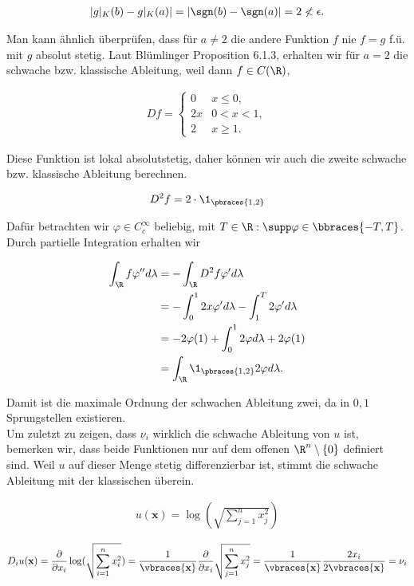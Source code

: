 \begin{solution}
\begin{align*}
  |g|_K(b) - g|_K(a)| = |\sgn(b) - \sgn(a)| = 2 \nless \epsilon.
\end{align*}

Man kann ähnlich überprüfen, dass für $a \neq 2$ die andere Funktion $f$ nie $f = g$ f.ü. mit $g$ absolut stetig. Laut Blümlinger Proposition 6.1.3, erhalten wir für $a = 2$ die schwache bzw. klassische Ableitung, weil dann $f \in C(\R)$,

\begin{align*}
  Df =
  \begin{cases}
    0  & x \leq 0,  \\
    2x & 0 < x < 1, \\
    2  & x \geq 1.
  \end{cases}
\end{align*}

Diese Funktion ist lokal absolutstetig, daher können wir auch die zweite schwache bzw. klassische Ableitung berechnen.

\begin{align*}
  D^2 f = 2 \cdot \1_{\pbraces{1, 2}}
\end{align*}

Dafür betrachten wir $\varphi \in C^{\infty}_c$ beliebig, mit $T \in \R: \supp \varphi \in \bbraces{-T, T}$. Durch partielle
Integration erhalten wir

\begin{align*}
    \int_\R f \varphi^{\prime \prime} d \lambda
    & = - \int_\R D^2f \varphi^\prime d \lambda \\
    & = - \int_0^1 2x \varphi^\prime d \lambda
        - \int_1^T 2 \varphi^\prime d \lambda \\
    & = - 2 \varphi(1)
        + \int_0^1 2 \varphi d \lambda
        + 2 \varphi(1) \\
    & = \int_\R \1_{\pbraces{1, 2}} 2 \varphi d \lambda.
\end{align*}

Damit ist die maximale Ordnung der schwachen Ableitung zwei, da in $0, 1$ Sprungstellen existieren. \\

Um zuletzt zu zeigen, dass $\nu_i$ wirklich die schwache Ableitung von $u$ ist, bemerken wir, dass beide Funktionen nur auf dem offenen $\R^n \setminus \{ 0 \}$ definiert sind. Weil $u$ auf dieser Menge stetig differenzierbar ist, stimmt die schwache Ableitung mit der klassischen überein.

\begin{align*}
    u(\textbf{x}) = \log(\sqrt{\sum_{j=1}^n x_j^2})
\end{align*}

\begin{align*}
    D_i u(\textbf{x})
  = \frac{\partial}{\partial x_i} \log(\sqrt{\sum_{i=1}^n x_i^2})
  = \frac{1}{\vbraces{\textbf{x}}} \frac{\partial}{\partial x_i}
    \sqrt{\sum_{j=1}^n x_j^2}
  = \frac{1}{\vbraces{\textbf{x}}} \frac{2x_i}{2\vbraces{\textbf{x}}}
  = \nu_i
\end{align*}
\end{solution}
